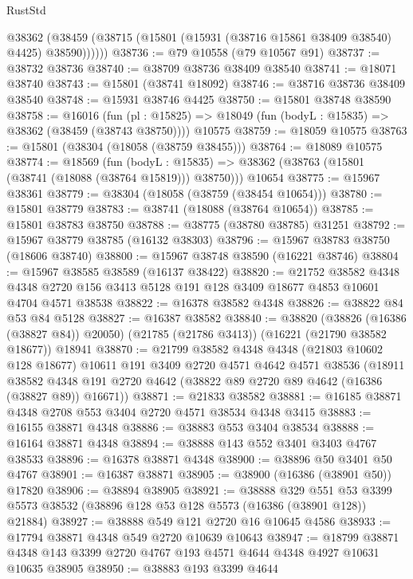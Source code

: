 \begin{lexlean}{RustStd}
\begin{coremodule}
        @38362 (@38459 (@38715 (@15801 (@15931 (@38716 @15861 @38409 @38540) @4425) @38590))))))
@38736 := @79 @10558 (@79 @10567 @91)
@38737 := @38732 @38736
@38740 := @38709 @38736 @38409 @38540
@38741 := @18071 @38740
@38743 := @15801 (@38741 @18092)
@38746 := @38716 @38736 @38409 @38540
@38748 := @15931 @38746 @4425
@38750 := @15801 @38748 @38590
@38758 := @16016
    (fun (pl : @15825) => @18049 (fun (bodyL : @15835) => @38362 (@38459 (@38743 @38750))))
    @10575
@38759 := @18059 @10575
@38763 := @15801 (@38304 (@18058 (@38759 @38455)))
@38764 := @18089 @10575
@38774 := @18569
    (fun (bodyL : @15835) => @38362 (@38763 (@15801 (@38741 (@18088 (@38764 @15819))) @38750)))
    @10654
@38775 := @15967 @38361
@38779 := @38304 (@18058 (@38759 (@38454 @10654)))
@38780 := @15801 @38779
@38783 := @38741 (@18088 (@38764 @10654))
@38785 := @15801 @38783 @38750
@38788 := @38775 (@38780 @38785) @31251
@38792 := @15967 @38779 @38785 (@16132 @38303)
@38796 := @15967 @38783 @38750 (@18606 @38740)
@38800 := @15967 @38748 @38590 (@16221 @38746)
@38804 := @15967 @38585 @38589 (@16137 @38422)
@38820 := @21752
    @38582
    @4348
    @4348
    @2720
    @156
    @3413
    @5128
    @191
    @128
    @3409
    @18677
    @4853
    @10601
    @4704
    @4571
    @38538
@38822 := @16378 @38582 @4348
@38826 := @38822 @84 @53 @84 @5128
@38827 := @16387 @38582
@38840 := @38820
    (@38826 (@16386 (@38827 @84)) @20050)
    (@21785 (@21786 @3413))
    (@16221 (@21790 @38582 @18677))
    @18941
@38870 := @21799
    @38582
    @4348
    @4348
    (@21803 @10602 @128 @18677)
    @10611
    @191
    @3409
    @2720
    @4571
    @4642
    @4571
    @38536
    (@18911 @38582 @4348 @191 @2720 @4642 (@38822 @89 @2720 @89 @4642 (@16386 (@38827 @89)) @16671))
@38871 := @21833 @38582
@38881 := @16185 @38871 @4348 @2708 @553 @3404 @2720 @4571 @38534 @4348 @3415
@38883 := @16155 @38871 @4348
@38886 := @38883 @553 @3404 @38534
@38888 := @16164 @38871 @4348
@38894 := @38888 @143 @552 @3401 @3403 @4767 @38533
@38896 := @16378 @38871 @4348
@38900 := @38896 @50 @3401 @50 @4767
@38901 := @16387 @38871
@38905 := @38900 (@16386 (@38901 @50)) @17820
@38906 := @38894 @38905
@38921 := @38888
    @329
    @551
    @53
    @3399
    @5573
    @38532
    (@38896 @128 @53 @128 @5573 (@16386 (@38901 @128)) @21884)
@38927 := @38888 @549 @121 @2720 @16 @10645 @4586
@38933 := @17794 @38871 @4348 @549 @2720 @10639 @10643
@38947 := @18799
    @38871
    @4348
    @143
    @3399
    @2720
    @4767
    @193
    @4571
    @4644
    @4348
    @4927
    @10631
    @10635
    @38905
@38950 := @38883 @193 @3399 @4644

\end{coremodule}
\end{lexlean}
